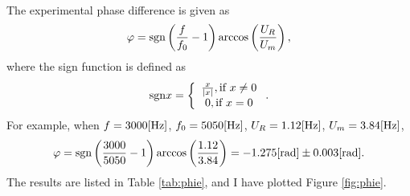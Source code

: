 \documentclass{my_template}
\renewcommand{\phi}{\varphi}
\begin{document}
    \paragraph{}The experimental phase difference is given as $$\phi={\rm sgn}\left(\frac{f}{f_0}-1\right)\arccos\left(\frac{U_R}{U_m}\right),$$ where the sign function is defined as 
    $${\rm sgn}x=
    \left\{\begin{array}{c}
        \frac{x}{|x|},\text{if }x\not=0\\
        0,\text{if }x=0
    \end{array}\right..$$
    For example, when $f=3000[\rm Hz]$, $f_0=5050[\rm Hz]$, $U_R=1.12[\rm Hz]$, $U_m=3.84[\rm Hz]$, $$\phi={\rm sgn}\left(\frac{3000}{5050}-1\right)\arccos\left(\frac{1.12}{3.84}\right)=-1.275[\rm rad]\pm 0.003[rad].$$
    The results are listed in Table \ref{tab:phie}, and I have plotted Figure \ref{fig:phie}.
\end{document}
